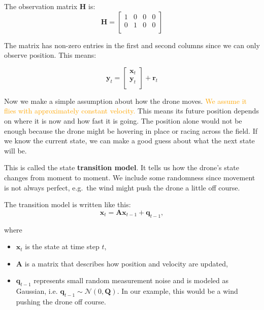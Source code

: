 \begin{example}
The observation matrix \textbf{H} is: 
\[\mathbf{H} = \begin{bmatrix}
   1 & 0 & 0 & 0\\
   0 & 1 & 0 & 0\\   
\end{bmatrix}\]

The matrix has non-zero entries in the first and second columns since we can only observe position. This means: 

\[\mathbf{y}_t = \begin{bmatrix}
   \textbf{x}_t \\
   \textbf{y}_t \\ 
\end{bmatrix} + \textbf{r}_t\]


Now we make a simple assumption about how the drone moves. %
\textcolor{orange}{We assume it flies with approximately constant velocity.} This means its future position depends on where it is now and how fast it is going. The position alone would not be enough because the drone might be hovering in place or racing across the field. If we know the current state, we can make a good guess about what the next state will be. 

This is called the state \textbf{transition model}. It tells us how the drone's state changes from moment to moment. We include some randomness since movement is not always perfect, e.g.~the wind might push the drone a little off course. 

The transition model is written like this: 
\begin{equation}\label{eq: transition model}
\textbf{x}_t = \textbf{A}\textbf{x}_{t-1}+\textbf{q}_{t-1},   
\end{equation}

where 
\begin{itemize}
    \item $\textbf{x}_t$ is the state at time step $t$,
    \item $\textbf{A}$ is a matrix that describes how position and velocity are updated, 
    \item $\mathbf{q}_{t-1}$ represents small random measurement noise and is modeled as Gaussian, i.e. $\mathbf{q}_{t-1} \sim \mathcal{N}(0, \mathbf{Q})$. In our example, this would be a wind pushing the drone off course. 
\end{itemize}


\end{example}
